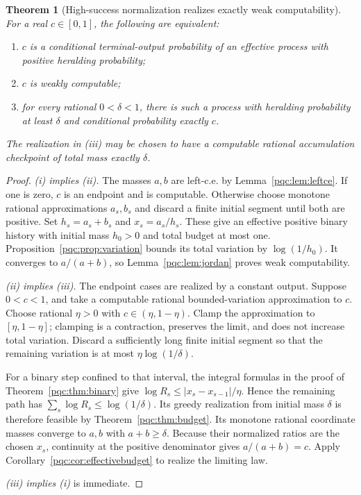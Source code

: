 \documentclass[11pt,letterpaper]{article}
\numberwithin{equation}{section}
\newtheorem{theorem}{Theorem}[section]
\theoremstyle{definition}
\theoremstyle{remark}
\begin{document}
\begin{theorem}[High-success normalization realizes exactly weak computability]
\label{pqc:thm:weakclassification}
For a real $c\in[0,1]$, the following are equivalent:
\begin{enumerate}[label=(\roman*),nosep]
\item $c$ is a conditional terminal-output probability of an effective
process with positive heralding probability;
\item $c$ is weakly computable;
\item for every rational $0<\delta<1$, there is such a process with heralding
probability at least $\delta$ and conditional probability exactly $c$.
\end{enumerate}
The realization in (iii) may be chosen to have a computable rational
accumulation checkpoint of total mass exactly $\delta$.
\end{theorem}
\begin{proof}
\emph{(i) implies (ii).} The masses $a,b$ are left-c.e. by
Lemma~\ref{pqc:lem:leftce}. If one is zero, $c$ is an endpoint and is computable.
Otherwise choose monotone rational approximations $a_s,b_s$ and discard a
finite initial segment until both are positive. Set
$h_s=a_s+b_s$ and $x_s=a_s/h_s$. These give an effective positive binary
history with initial mass $h_0>0$ and total budget at most one.
Proposition~\ref{pqc:prop:variation} bounds its total variation by
$\log(1/h_0)$. It converges to $a/(a+b)$, so
Lemma~\ref{pqc:lem:jordan} proves weak computability.

\emph{(ii) implies (iii).} The endpoint cases are realized by a constant
output. Suppose $0<c<1$, and take a computable rational bounded-variation
approximation to $c$. Choose rational $\eta>0$ with
$c\in(\eta,1-\eta)$. Clamp the approximation to $[\eta,1-\eta]$; clamping
is a contraction, preserves the limit, and does not increase total variation.
Discard a sufficiently long finite initial segment so that the remaining
variation is at most $\eta\log(1/\delta)$.

For a binary step confined to that interval, the integral formulas in the
proof of Theorem~\ref{pqc:thm:binary} give
$\log R_s\le|x_s-x_{s-1}|/\eta$. Hence the remaining path has
$\sum_s\log R_s\le\log(1/\delta)$. Its greedy realization from initial
mass $\delta$ is therefore feasible by Theorem~\ref{pqc:thm:budget}. Its
monotone rational coordinate masses converge to $a,b$ with $a+b\ge\delta$.
Because their normalized ratios are the chosen $x_s$, continuity at the
positive denominator gives $a/(a+b)=c$. Apply
Corollary~\ref{pqc:cor:effectivebudget} to realize the limiting law.

\emph{(iii) implies (i)} is immediate.
\end{proof}
\end{document}
